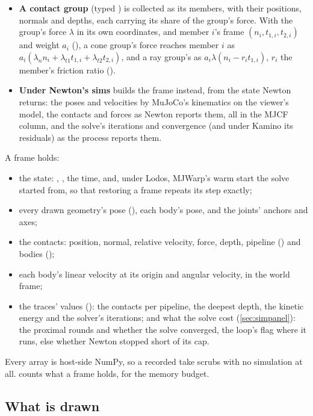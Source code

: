 \begin{itemize}
\item \textbf{A contact group} (typed ) is collected as its members, with their positions, normals and depths, each carrying its share of the group's force. With the group's force $\lambda$ in its own coordinates, and member $i$'s frame $(n_i, t_{1,i}, t_{2,i})$ and weight $a_i$ (), a cone group's force reaches member $i$ as $a_i(\lambda_n n_i + \lambda_{t1} t_{1,i} + \lambda_{t2} t_{2,i})$, and a ray group's as $a_i \lambda (n_i - r_i t_{1,i})$, $r_i$ the member's friction ratio ().
\item \textbf{Under Newton's sims}  builds the frame instead, from the state Newton returns: the poses and velocities by MuJoCo's kinematics on the viewer's model, the contacts and forces as Newton reports them, all in the MJCF column, and the solve's iterations and convergence (and under Kamino its residuals) as the process reports them.
\end{itemize}

A frame holds:

\begin{itemize}
\item the state: , , the time, and, under Lodos, MJWarp's warm start the solve started from, so that restoring a frame repeats its step exactly;
\item every drawn geometry's pose (), each body's pose, and the joints' anchors and axes;
\item the contacts: position, normal, relative velocity, force, depth, pipeline () and bodies ();
\item each body's linear velocity at its origin and angular velocity, in the world frame;
\item the traces' values (): the contacts per pipeline, the deepest depth, the kinetic energy and the solver's iterations; and what the solve cost (\cref{sec:simpanel}): the proximal rounds and whether the solve converged, the loop's flag where it runs, else whether Newton stopped short of its cap.
\end{itemize}

Every array is host-side NumPy, so a recorded take scrubs with no simulation at all.  counts what a frame holds, for the memory budget.

\subsection{What is drawn}\label{sec:drawn}

